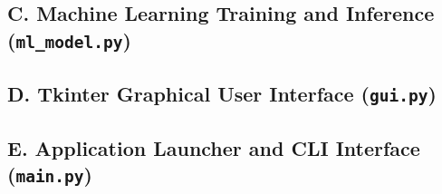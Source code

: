 \documentclass[11pt, a4paper]{article}
\begin{document}
\clearpage
\subsection*{C. Machine Learning Training and Inference (\texttt{ml\_model.py})}


\clearpage
\subsection*{D. Tkinter Graphical User Interface (\texttt{gui.py})}


\clearpage
\subsection*{E. Application Launcher and CLI Interface (\texttt{main.py})}

\end{document}
